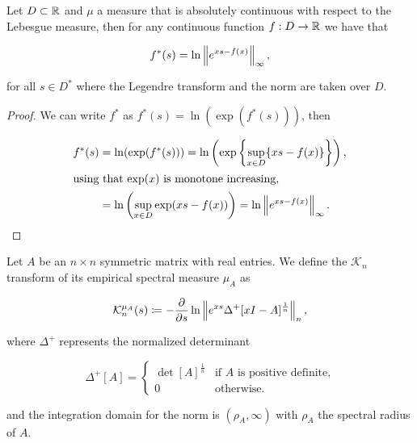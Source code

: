 \begin{lemma} \label{lemma:legendre_transform_norm}
    Let $D \subset \mathbb R$ and $\mu$ a measure that is absolutely continuous with respect to the Lebesgue measure, then for any continuous function $f: D \to \mathbb R$ we have that

    \begin{equation*}
        f^*(s) = \ln \left\lVert e^{xs - f(x)} \right\rVert_{\infty},
    \end{equation*}

    \noindent for all $s \in D^*$ where the Legendre transform and the norm are taken over $D$.
\end{lemma}

\begin{proof}
    We can write $f^*$ as $f^*(s) = \ln(\exp(f^*(s)))$, then

    \begin{align*}
        f^*(s) &= \ln(\exp(f^*(s))) = \ln \left(\exp\left\{ \sup_{x\in D} \{xs-f(x)\} \right\}\right), \\
        \intertext{using that $\exp(x)$ is monotone increasing,}
        &= \ln \left( \sup_{x \in D} \exp(xs - f(x))\right) = \ln \left\lVert e^{xs-f(x)} \right\rVert_{\infty}.
    \end{align*}
\end{proof}

\begin{definition}
    Let $A$ be an $n\times n$ symmetric matrix with real entries. We define the $\mathcal K_n$ transform of its empirical spectral measure $\mu_A$ as 

    \begin{equation*}
        \mathcal K_n^{\mu_A} (s) \coloneqq - \frac{\partial}{\partial s} \ln \left\lVert e^{xs} \Delta^+ [x I - A]^{\frac1n} \right\rVert_n,
    \end{equation*}

    \noindent where $\Delta^+$ represents the normalized determinant
    
    \begin{equation*}
        \Delta^+[A] = \left\{ \begin{array}{cc}
            \det[A]^{\frac1n} & \text{if $A$ is positive definite,}\\
            0 & \text{otherwise.}
        \end{array} \right.
    \end{equation*}
    
    \noindent and the integration domain for the norm is $(\rho_A, \infty)$ with $\rho_A$ the spectral radius of $A$.
\end{definition}


